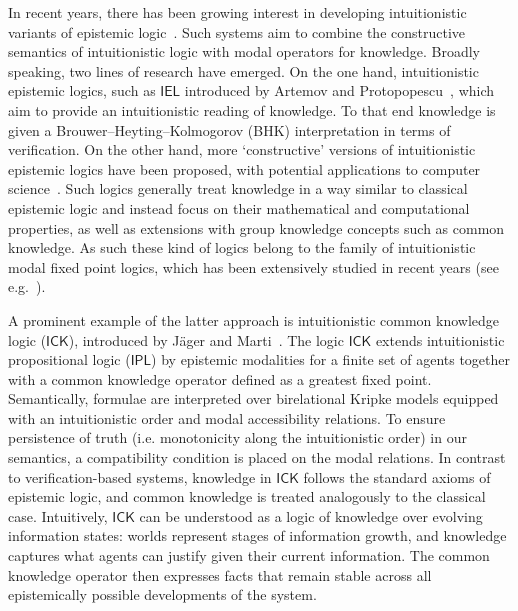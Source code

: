 \documentclass{myifcolog}
\newcommand{\ICK}{\mathsf{ICK}}
\numberwithin{theorem}{section}
\begin{document}
In recent years, there has been growing interest in developing intuitionistic variants of epistemic logic~\cite{Williamson_1992, Artemov_2016, jager-intuitionistic_2016, proietti_2012, Hirai_2010}. Such systems aim to combine the constructive semantics of intuitionistic logic with modal operators for knowledge. Broadly speaking, two lines of research have emerged. On the one hand, intuitionistic epistemic logics, such as $\mathsf{IEL}$ introduced by Artemov and Protopopescu~\cite{Artemov_2016}, which aim to provide an intuitionistic reading of knowledge. To that end knowledge is given a Brouwer–Heyting–Kolmogorov (BHK) interpretation in terms of verification. On the other hand, more `constructive' versions of intuitionistic epistemic logics have been proposed, with potential applications to computer science~\cite{Hirai_2010}. Such logics generally treat knowledge in a way similar to classical epistemic logic and instead focus on their mathematical and computational properties, as well as extensions with group knowledge concepts such as common knowledge. As such these kind of logics belong to the family of intuitionistic modal fixed point logics, which has been extensively studied in recent years (see e.g.~\cite{fernandez-duque_2018, Boudou_2021, afshari_ill-founded_2023, afshari_intuitionistic_2024, afshari2025intuitionistic, Pacheco_2024, fernandez-duque_sound_2024, Fernandez-Duque_complexity_2025, Boudou_2017}).

A prominent example of the latter approach is intuitionistic common knowledge logic ($\ICK$), introduced by Jäger and Marti~\cite{jager-intuitionistic_2016}. The logic $\ICK$ extends intuitionistic propositional logic ($\mathsf{IPL}$) by epistemic modalities for a finite set of agents together with a common knowledge operator defined as a greatest fixed point. Semantically, formulae are interpreted over birelational Kripke models equipped with an intuitionistic order and modal accessibility relations. To ensure persistence of truth (i.e. monotonicity along the intuitionistic order) in our semantics, a compatibility condition is placed on the modal relations. In contrast to verification-based systems, knowledge in $\mathsf{ICK}$ follows the standard axioms of epistemic logic, and common knowledge is treated analogously to the classical case. Intuitively, $\mathsf{ICK}$ can be understood as a logic of knowledge over evolving information states: worlds represent stages of information growth, and knowledge captures what agents can justify given their current information. The common knowledge operator then expresses facts that remain stable across all epistemically possible developments of the system.
\end{document}
